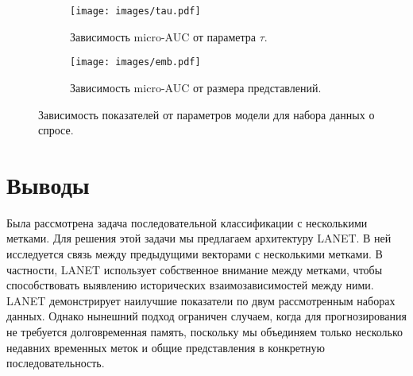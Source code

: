 \documentclass[a4paper, 12pt]{article} %
\begin{document}
\begin{figure}[h!]
     \centering
     \begin{subfigure}[b]{0.47\textwidth}
         \centering
         \texttt{[image: images/tau.pdf]}
         \caption{Зависимость micro-AUC от параметра \textit{$\tau$}.}
         \label{fig:look_back}
     \end{subfigure}
     \hfill
     \begin{subfigure}[b]{0.47\textwidth}
         \centering
         \texttt{[image: images/emb.pdf]}
         \caption{Зависимость micro-AUC от размера представлений.}
         \label{fig:emb_dim}
     \end{subfigure}
    \caption{Зависимость показателей от параметров модели для набора данных о спросе.}
    \label{tau}
\end{figure}
 



\section{Выводы}
Была рассмотрена задача последовательной классификации с несколькими метками.
Для решения этой задачи мы предлагаем архитектуру LANET. В ней исследуется связь между предыдущими векторами с несколькими метками. В частности, LANET использует собственное внимание между метками, чтобы способствовать выявлению исторических взаимозависимостей между ними. 
LANET демонстрирует наилучшие показатели по двум рассмотренным наборах данных.  
Однако нынешний подход ограничен случаем, когда для прогнозирования не требуется долговременная память, поскольку мы объединяем только несколько недавних временных меток и общие представления в конкретную последовательность.
\end{document}
